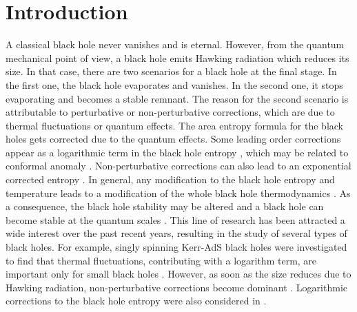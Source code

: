 \documentclass[10pt,a4paper]{article}
\begin{document}
\section{Introduction}
A classical black hole never vanishes and is eternal. However, from the quantum mechanical point of view, a black hole emits Hawking radiation \cite{Page:2004xp}  which reduces its size. In that case, there are two scenarios for a black hole at the final stage. In the first one, the black hole evaporates and vanishes. In the second one, it stops evaporating and becomes a stable remnant. The reason for the second scenario is attributable to perturbative \cite{Das:2001ic, Pourhassan:2015cga} or non-perturbative \cite{Chatterjee:2020iuf, Pourhassan:2020yei} corrections, which are due to thermal fluctuations or quantum effects. The area entropy formula \cite{Bardeen:1973gs} for the black holes gets corrected due to the quantum effects. Some leading order corrections appear as a logarithmic term in the black hole entropy \cite{Sadeghi:2016dvc}, which may be related to conformal anomaly \cite{Xiao:2021zly}. Non-perturbative corrections can also lead to an exponential corrected entropy \cite{Pourhassan:2021mhb}. In general, any modification to the black hole entropy and temperature leads to a modification of the whole black hole thermodynamics \cite{Rostami:2019dom}. As a consequence, the black hole stability may be altered and a black hole can become stable at the quantum scales \cite{Upadhyay:2019hyw}. This line of research has been attracted a wide interest over the past recent years, resulting in the study of several types of black holes. For example, singly spinning Kerr-AdS black holes were investigated to find that thermal fluctuations, contributing with a logarithm term, are important only for small black holes \cite{Pourhassan:2016zzc}. However, as soon as the size reduces due to Hawking radiation, non-perturbative corrections become dominant \cite{Pourhassan:2020bzu}. Logarithmic corrections to the black hole entropy were also considered in \cite{Castro:2018hsc}.
\end{document}
